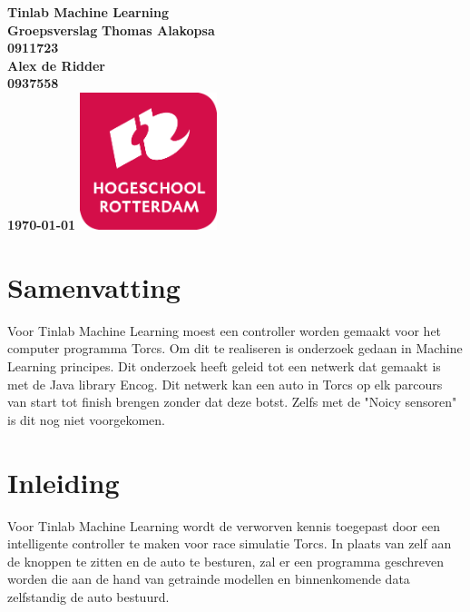\documentclass{article}
\begin{document}
\sffamily
\begin{titlepage}
  \centering
    \vfill
    {\bfseries\Huge
      Tinlab Machine Learning \\
      Groepsverslag
        \vskip2cm
      }
      {\bfseries\Large
      	Thomas Alakopsa\\
      	{ \bfseries\normalsize
      	0911723\\
      	}
      }
      {\bfseries\Large
      	Alex de Ridder\\
      	{ \bfseries\normalsize
      	0937558\\
      	}
      }
      {
        \bfseries\normalsize
        \vskip2cm
        \today
    }    
    \vfill
    \includegraphics[width=4cm]{logohr.png}
    \vfill
    \vfill
\end{titlepage}
\newpage

\section{Samenvatting}
Voor Tinlab Machine Learning moest een controller worden gemaakt voor het computer programma Torcs. Om dit te realiseren is onderzoek gedaan in Machine Learning principes. Dit onderzoek heeft geleid tot een netwerk dat gemaakt is met de Java library Encog. Dit netwerk kan een auto in Torcs op elk parcours 
van start tot finish brengen zonder dat deze botst. Zelfs met de "Noicy sensoren" is dit nog niet voorgekomen. 

\section{Inleiding}
Voor Tinlab Machine Learning wordt de verworven kennis toegepast door een intelligente controller te maken voor race simulatie Torcs. In plaats van zelf aan de knoppen te zitten en de auto te besturen, zal er een programma geschreven worden die aan de hand van getrainde modellen en binnenkomende data zelfstandig de auto bestuurd. 
\end{document}
